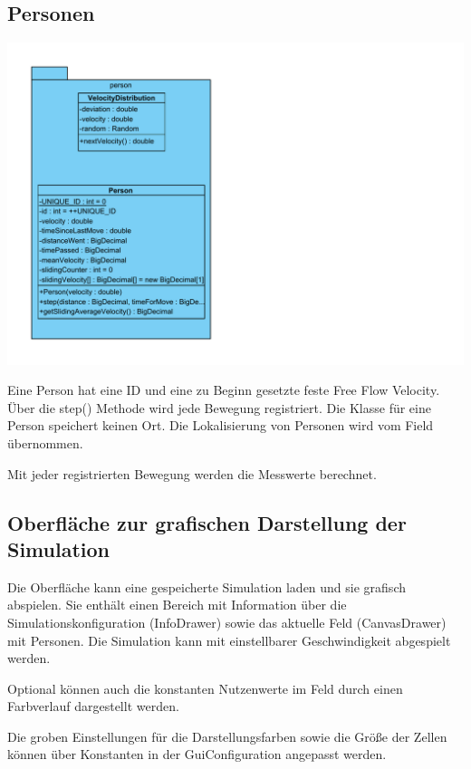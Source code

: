 \subsection{Personen}

\includegraphics[width=\textwidth]{abbildungen/uml/person}

Eine Person hat eine ID und eine zu Beginn gesetzte feste Free Flow Velocity.
Über die step() Methode wird jede Bewegung registriert. Die Klasse für eine Person speichert keinen Ort. Die Lokalisierung von Personen wird vom Field übernommen.

Mit jeder registrierten Bewegung werden die Messwerte berechnet.


\subsection{Oberfläche zur grafischen Darstellung der Simulation}

Die Oberfläche kann eine gespeicherte Simulation laden und sie grafisch abspielen. Sie enthält einen Bereich mit Information über die  Simulationskonfiguration (InfoDrawer) sowie das aktuelle Feld (CanvasDrawer) mit Personen. Die Simulation kann mit einstellbarer Geschwindigkeit  abgespielt werden.

Optional können auch die konstanten Nutzenwerte im Feld durch einen Farbverlauf dargestellt werden.

Die groben Einstellungen für die Darstellungsfarben sowie die Größe der Zellen können über Konstanten in der GuiConfiguration angepasst werden.

